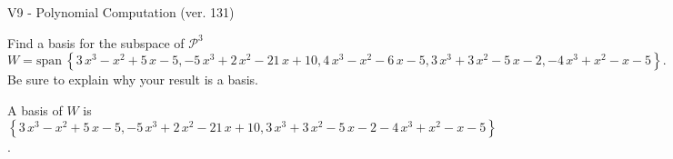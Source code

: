 \begin{exercise}
  \begin{exerciseTitle}V9 - Polynomial Computation (ver. 131)\end{exerciseTitle}
  \begin{exerciseStatement}
    Find a basis for the subspace of \(\mathcal{P}^3\) 
\[W=\mathrm{span}\ \left\{3 \, x^{3} - x^{2} + 5 \, x - 5 , -5 \, x^{3} + 2 \, x^{2} - 21 \, x + 10 , 4 \, x^{3} - x^{2} - 6 \, x - 5 , 3 \, x^{3} + 3 \, x^{2} - 5 \, x - 2 , -4 \, x^{3} + x^{2} - x - 5\right\}.\]
 Be sure to explain why your result is a basis.


  \end{exerciseStatement}
  \begin{exerciseAnswer}
   A basis of \(W\) is  \(\left\{3 \, x^{3} - x^{2} + 5 \, x - 5 , -5 \, x^{3} + 2 \, x^{2} - 21 \, x + 10 , 3 \, x^{3} + 3 \, x^{2} - 5 \, x - 2 -4 \, x^{3} + x^{2} - x - 5\right\}\).
  


  \end{exerciseAnswer}
\end{exercise}